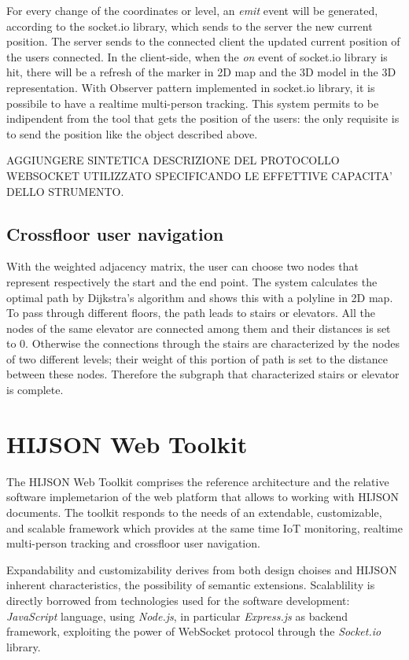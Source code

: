 \documentclass{sig-alternate}
\begin{document}
For every change of the coordinates or level, an \emph{emit} event will
be generated, according to the socket.io library, which sends to the
server the new current position. The server sends to the connected
client the updated current position of the users connected. In the
client-side, when the \emph{on} event of socket.io library is hit, there
will be a refresh of the marker in 2D map and the 3D model in the 3D
representation. With Observer pattern implemented in socket.io library,
it is possibile to have a realtime multi-person tracking. This system
permits to be indipendent from the tool that gets the position of the
users: the only requisite is to send the position like the object
described above.

AGGIUNGERE SINTETICA DESCRIZIONE DEL PROTOCOLLO WEBSOCKET UTILIZZATO
SPECIFICANDO LE EFFETTIVE CAPACITA' DELLO STRUMENTO.

\subsection{Crossfloor user navigation}\label{crossfloor-user-navigation}

With the weighted adjacency matrix, the user can choose two nodes that
represent respectively the start and the end point. The system
calculates the optimal path by Dijkstra's algorithm and shows this with
a polyline in 2D map. To pass through different floors, the path leads
to stairs or elevators. All the nodes of the same elevator are connected
among them and their distances is set to 0. Otherwise the connections
through the stairs are characterized by the nodes of two different
levels; their weight of this portion of path is set to the distance
between these nodes. Therefore the subgraph that characterized stairs or
elevator is complete.


\section{HIJSON Web Toolkit}\label{hijson-web-toolkit}

The HIJSON Web Toolkit comprises the reference architecture and the
relative software implemetarion of the web platform that allows to
working with HIJSON documents. The toolkit responds to the needs of an
extendable, customizable, and scalable framework which provides at the
same time IoT monitoring, realtime multi-person tracking and crossfloor
user navigation.

Expandability and customizability derives from both design choises and
HIJSON inherent characteristics, the possibility of semantic extensions.
Scalablility is directly borrowed from technologies used for the
software development: \emph{JavaScript} language, using \emph{Node.js},
in particular \emph{Express.js} as backend framework, exploiting the
power of WebSocket protocol through the \emph{Socket.io} library.
\end{document}

